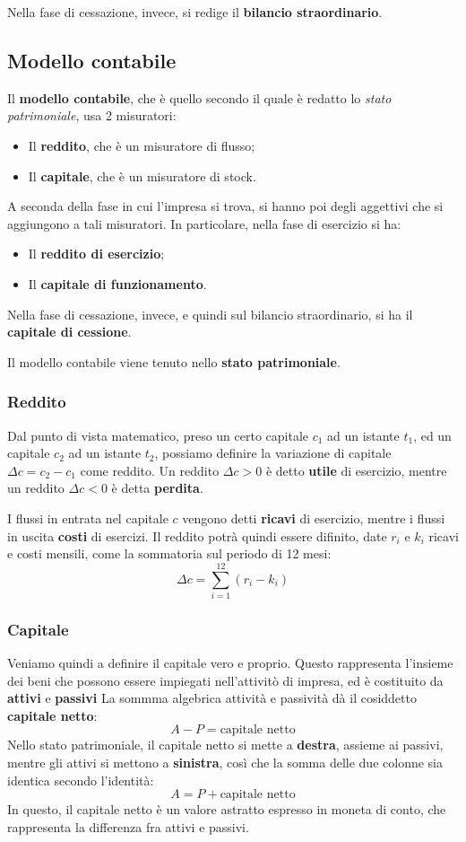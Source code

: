 \documentclass[a4paper,11pt]{article}
\begin{document}
Nella fase di cessazione, invece, si redige il \textbf{bilancio straordinario}.

\subsection{Modello contabile}
Il \textbf{modello contabile}, che è quello secondo il quale è redatto lo \textit{stato patrimoniale}, usa 2 misuratori:
\begin{itemize}
	\item Il \textbf{reddito}, che è un misuratore di flusso;
	\item Il \textbf{capitale}, che è un misuratore di stock.
\end{itemize}
A seconda della fase in cui l'impresa si trova, si hanno poi degli aggettivi che si aggiungono a tali misuratori.
In particolare, nella fase di esercizio si ha:
\begin{itemize}
	\item Il \textbf{reddito di esercizio};
	\item Il \textbf{capitale di funzionamento}.
\end{itemize}
Nella fase di cessazione, invece, e quindi sul bilancio straordinario, si ha il \textbf{capitale di cessione}. 

Il modello contabile viene tenuto nello \textbf{stato patrimoniale}. 

\subsubsection{Reddito}
Dal punto di vista matematico, preso un certo capitale $c_1$ ad un istante $t_1$, ed un capitale $c_2$ ad un istante $t_2$, possiamo definire la variazione di capitale $\Delta c = c_2 - c_1$ come reddito.
Un reddito $\Delta c > 0$ è detto \textbf{utile} di esercizio, mentre un reddito $\Delta c < 0$ è detta \textbf{perdita}.

I flussi in entrata nel capitale $c$ vengono detti \textbf{ricavi} di esercizio, mentre i flussi in uscita \textbf{costi} di esercizi.
Il reddito potrà quindi essere difinito, date $r_i$ e $k_i$ ricavi e costi mensili, come la sommatoria sul periodo di 12 mesi:
$$
\Delta c = \sum_{i = 1}^{12} \left( r_i - k_i \right)
$$

\subsubsection{Capitale}
Veniamo quindi a definire il capitale vero e proprio. 
Questo rappresenta l'insieme dei beni che possono essere impiegati nell'attivitò di impresa, ed è costituito da \textbf{attivi} e \textbf{passivi}  
La sommma algebrica attività e passività dà il cosiddetto \textbf{capitale netto}:
$$
A - P = \text{capitale netto}
$$
Nello stato patrimoniale, il capitale netto si mette a \textbf{destra}, assieme ai passivi, mentre gli attivi si mettono a \textbf{sinistra}, così che la somma delle due colonne sia identica secondo l'identità:
$$
A = P + \text{capitale netto}
$$
In questo, il capitale netto è un valore astratto espresso in moneta di conto, che rappresenta la differenza fra attivi e passivi.
\end{document}
